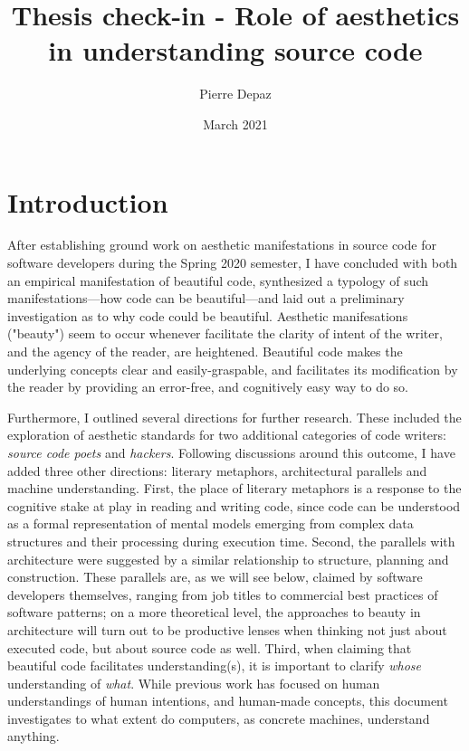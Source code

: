 \documentclass{article}
\begin{document}
\title{Thesis check-in - Role of aesthetics in understanding source code}
\author{Pierre Depaz}
\date{March 2021}
\maketitle

\section{Introduction}

After establishing ground work on aesthetic manifestations in source code for software developers during the Spring 2020 semester, I have concluded with both an empirical manifestation of beautiful code, synthesized a typology of such manifestations—how code can be beautiful—and laid out a preliminary investigation as to why code could be beautiful. Aesthetic manifesations ("beauty") seem to occur whenever facilitate the clarity of intent of the writer, and the agency of the reader, are heightened. Beautiful code makes the underlying concepts clear and easily-graspable, and facilitates its modification by the reader by providing an error-free, and cognitively easy way to do so.

Furthermore, I outlined several directions for further research. These included the exploration of aesthetic standards for two additional categories of code writers: \emph{source code poets} and \emph{hackers}. Following discussions around this outcome, I have added three other directions: literary metaphors, architectural parallels and machine understanding. First, the place of literary metaphors is a response to the cognitive stake at play in reading and writing code, since code can be understood as a formal representation of mental models emerging from complex data structures and their processing during execution time. Second, the parallels with architecture were suggested by a similar relationship to structure, planning and construction. These parallels are, as we will see below, claimed by software developers themselves, ranging from job titles to commercial best practices of software patterns; on a more theoretical level, the approaches to beauty in architecture will turn out to be productive lenses when thinking not just about executed code, but about source code as well. Third, when claiming that beautiful code facilitates understanding(s), it is important to clarify \emph{whose} understanding of \emph{what}. While previous work has focused on human understandings of human intentions, and human-made concepts, this document investigates to what extent do computers, as concrete machines, understand anything.
\end{document}
